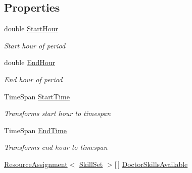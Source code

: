 \subsection*{Properties}
\begin{DoxyCompactItemize}
\item 
double \hyperlink{class_general_health_care_elements_1_1_staff_handling_1_1_staff_availability_period_a1d99b3dbefe37ef8875ecded198eb6cf}{Start\+Hour}
\begin{DoxyCompactList}\small\item\em Start hour of period \end{DoxyCompactList}\item 
double \hyperlink{class_general_health_care_elements_1_1_staff_handling_1_1_staff_availability_period_aca76853a174200531da0f3de0783109c}{End\+Hour}
\begin{DoxyCompactList}\small\item\em End hour of period \end{DoxyCompactList}\item 
Time\+Span \hyperlink{class_general_health_care_elements_1_1_staff_handling_1_1_staff_availability_period_acb352568b972d833fd05150a1aee09d3}{Start\+Time}
\begin{DoxyCompactList}\small\item\em Transforms start hour to timespan \end{DoxyCompactList}\item 
Time\+Span \hyperlink{class_general_health_care_elements_1_1_staff_handling_1_1_staff_availability_period_a9ebd6b22f0d21e837c2fe9d594a30018}{End\+Time}
\begin{DoxyCompactList}\small\item\em Transforms end hour to timespan \end{DoxyCompactList}\item 
\hyperlink{class_general_health_care_elements_1_1_resource_handling_1_1_resource_assignment}{Resource\+Assignment}$<$ \hyperlink{class_simulation_core_1_1_h_c_c_m_elements_1_1_skill_set}{Skill\+Set} $>$\mbox{[}$\,$\mbox{]} \hyperlink{class_general_health_care_elements_1_1_staff_handling_1_1_staff_availability_period_ae08c61ed6121d737bf6d312fe36dc9a5}{Doctor\+Skills\+Available}

\end{DoxyCompactItemize}
